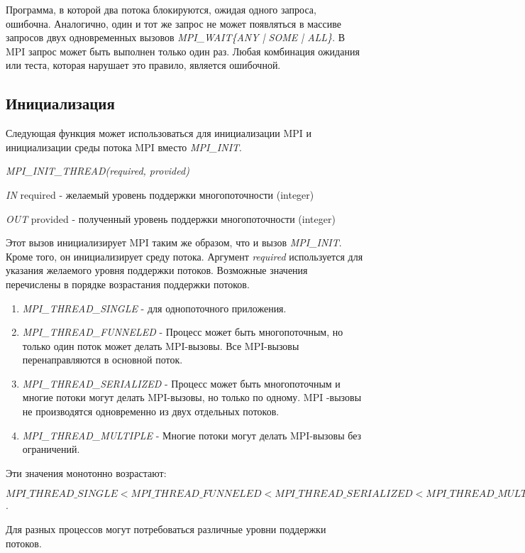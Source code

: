 	Программа, в которой два потока блокируются, ожидая одного запроса, ошибочна. 
	Аналогично, один и тот же запрос не может появляться в массиве запросов двух одновременных вызовов \textit{MPI\_WAIT\{ANY | SOME | ALL\}}. 
	В MPI запрос может быть выполнен только один раз. 
	Любая комбинация ожидания или теста, которая нарушает это правило, является ошибочной.
	
	\subsection{Инициализация}
	Следующая функция может использоваться для инициализации MPI и инициализации среды потока MPI вместо \textit{MPI\_INIT}.
	
	\textit{MPI\_INIT\_THREAD(required, provided)}
	
	\textit{IN} required - желаемый уровень поддержки многопоточности (integer)
	
	\textit{OUT} provided - полученный уровень поддержки многопоточности (integer)
	
	Этот вызов инициализирует MPI таким же образом, что и вызов \textit{MPI\_INIT}. Кроме того, он инициализирует среду потока. Аргумент \textit{required} используется для указания желаемого уровня поддержки потоков. Возможные значения перечислены в порядке возрастания поддержки потоков.
	
	\begin{enumerate}
		\item \textit{MPI\_THREAD\_SINGLE} - для однопоточного приложения.
		\item \textit{MPI\_THREAD\_FUNNELED} - Процесс может быть многопоточным, но только один поток может делать MPI-вызовы. Все MPI-вызовы перенаправляются в основной поток.
		\item \textit{MPI\_THREAD\_SERIALIZED} - Процесс может быть многопоточным и многие потоки могут делать MPI-вызовы, но только по одному.
		MPI -вызовы не производятся одновременно из двух отдельных потоков.
		\item \textit{MPI\_THREAD\_MULTIPLE} - Многие потоки могут делать MPI-вызовы без ограничений.
	\end{enumerate}

	Эти значения монотонно возрастают:
	
	$ MPI\_THREAD\_SINGLE < MPI\_THREAD\_FUNNELED < MPI\_THREAD\_SERIALIZED < MPI\_THREAD\_MULTIPLE $.
	 
	Для разных процессов могут потребоваться различные уровни поддержки потоков.
	
